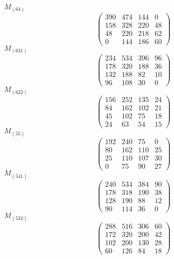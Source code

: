 \documentclass[12pt,reqno]{amsart}
\begin{document}
$M_{(64)}$                             $$ \begin{pmatrix} 
                        390 & 474 & 144 & 0 \\[6pt]
                       158 & 328 & 220 & 48 \\[6pt]
                        48 & 220 & 218 & 62 \\[6pt]
                          0 & 144 & 186 & 60
                              \end{pmatrix} $$ 
$M_{(631)}$                             $$ \begin{pmatrix} 
                       234 & 534 & 396 & 96 \\[6pt]
                       178 & 320 & 188 & 36 \\[6pt]
                        132 & 188 & 82 & 10 \\[6pt]
                           96 & 108 & 30 & 0
                              \end{pmatrix} $$ 
$M_{(622)}$                             $$ \begin{pmatrix} 
                       156 & 252 & 135 & 24 \\[6pt]
                        84 & 162 & 102 & 21 \\[6pt]
                        45 & 102 & 75 & 18 \\[6pt]
                           24 & 63 & 54 & 15
                              \end{pmatrix} $$ 
$M_{(55)}$                             $$ \begin{pmatrix} 
                        192 & 240 & 75 & 0 \\[6pt]
                        80 & 162 & 110 & 25 \\[6pt]
                        25 & 110 & 107 & 30 \\[6pt]
                           0 & 75 & 90 & 27
                              \end{pmatrix} $$ 
$M_{(541)}$                             $$ \begin{pmatrix} 
                       240 & 534 & 384 & 90 \\[6pt]
                       178 & 318 & 190 & 38 \\[6pt]
                        128 & 190 & 88 & 12 \\[6pt]
                           90 & 114 & 36 & 0
                              \end{pmatrix} $$ 
$M_{(532)}$                             $$ \begin{pmatrix} 
                       288 & 516 & 306 & 60 \\[6pt]
                       172 & 320 & 200 & 42 \\[6pt]
                       102 & 200 & 130 & 28 \\[6pt]
                          60 & 126 & 84 & 18
                              \end{pmatrix} $$ 
\end{document}
